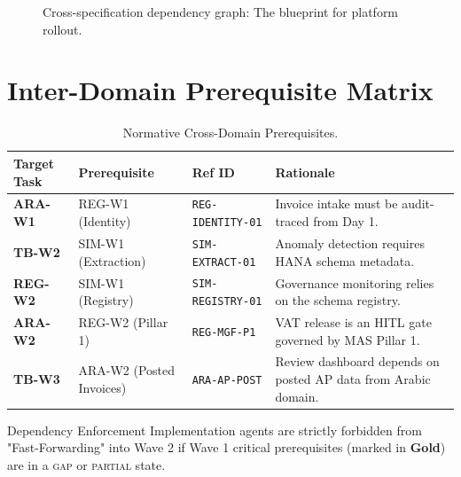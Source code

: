 \begin{figure}[htbp]
\caption{Cross-specification dependency graph: The blueprint for platform rollout.}
\end{figure}

\section{Inter-Domain Prerequisite Matrix}

\begin{table}[htbp]
\centering
\footnotesize
\caption{Normative Cross-Domain Prerequisites.}
\label{tab:prerequisites}
\begin{tabularx}{\textwidth}{@{}l l l X@{}}
\toprule
\textbf{Target Task} & \textbf{Prerequisite} & \textbf{Ref ID} & \textbf{Rationale} \\
\midrule
\rowcolor{sapmidnight!5}
\textbf{ARA-W1} & REG-W1 (Identity) & \texttt{REG-IDENTITY-01} & Invoice intake must be audit-traced from Day 1. \\
\textbf{TB-W2}  & SIM-W1 (Extraction) & \texttt{SIM-EXTRACT-01} & Anomaly detection requires HANA schema metadata. \\
\rowcolor{sapmidnight!5}
\textbf{REG-W2} & SIM-W1 (Registry) & \texttt{SIM-REGISTRY-01} & Governance monitoring relies on the schema registry. \\
\textbf{ARA-W2} & REG-W2 (Pillar 1) & \texttt{REG-MGF-P1} & VAT release is an HITL gate governed by MAS Pillar 1. \\
\rowcolor{sapmidnight!5}
\textbf{TB-W3}  & ARA-W2 (Posted Invoices) & \texttt{ARA-AP-POST} & Review dashboard depends on posted AP data from Arabic domain. \\
\bottomrule
\end{tabularx}
\end{table}

\begin{adrbox}{Dependency Enforcement}
Implementation agents are strictly forbidden from "Fast-Forwarding" into Wave 2 if Wave 1 critical prerequisites (marked in \textcolor{sapamber}{\textbf{Gold}}) are in a \textsc{gap} or \textsc{partial} state.
\end{adrbox}


